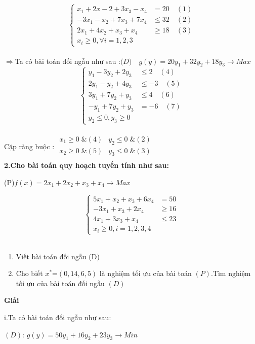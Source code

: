 \documentclass{article}
\begin{document}
\[\left\{\begin{aligned}
x_1+2x-2+3x_3-x_4&=20 \quad(1)\\
-3x_1-x_2+7x_3+7x_4&\leq 32 \quad(2)\\
2x_1+4x_2+x_3+x_4&\geq 18 \quad(3)\\
x_i\geq 0,\forall i=1,2,3
\end{aligned}\right.\]\\
$\Longrightarrow$Ta có bài toán đối ngẫu như sau :$ \big(D\big)\quad g(y)=20y_1+32y_2+18y_3 \longrightarrow Max$ \\
\[\left\{\begin{aligned}
y_1-3y_2+2y_3&\leq 2 \quad(4)\\
2y_1-y_2+4y_3&\leq-3 \quad(5)\\
3y_1+7y_2+y_3&\leq 4 \quad(6)\\
-y_1+7y_2+y_3&=-6 \quad(7)\\
y_2\leq 0,y_3\geq 0
\end{aligned}\right.\]\\
Cặp ràng buộc : $\begin{array}{cr} 
x_1\geq 0\; \&(4) &y_2\leq 0\; \&(2)\\
x_2\geq 0\; \&(5) &y_3\leq 0\; \&(3)\\
\end{array}$\\
\textbf{2.Cho bài toán quy hoạch tuyến tính như sau:}\\
\begin{center}
\big(P\big)\quad $f(x)=2x_1+2x_2+x_3+x_4 \longrightarrow Max$\\
\end{center}
\[\left\{\begin{aligned}
5x_1+x_2+x_3+6x_4&=50 \\
-3x_1+x_3+2x_4&\geq16 \\
4x_1+3x_3+x_4&\leq23 \\
x_i\geq 0,i=1,2,3,4 
\end{aligned}\right.\]\\
\begin{enumerate}
\item Viết bài toán đối ngẫu \big(D\big)
\item Cho biết $x^*$=$\left(0,14,6,5\right)$ là nghiệm tối ưu của bài toán
 $\left(P\right)$.Tìm nghiệm tối ưu của bài toán đối ngẫu $\left(D\right)$
\end{enumerate}
\begin{center}
\textbf{Giải}
\end{center}
i.Ta có bài toán đối ngẫu như sau:\\
\begin{center}
$\left(D\right)$: $g(y)=50y_1+16y_2+23y_3 \longrightarrow  Min$\\
\end{center}
\end{document}
